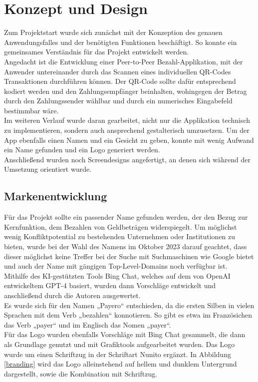 
\chapter{Konzept und Design}

Zum Projektstart wurde sich zunächst mit der Konzeption des genauen Anwendungsfalles und der benötigten Funktionen beschäftigt.
So konnte ein gemeinsames Verständnis für das Projekt entwickelt werden.
\\
Angedacht ist die Entwicklung einer Peer-to-Peer Bezahl-Applikation, mit der Anwender untereinander durch das Scannen eines individuellen QR-Codes Transaktionen durchführen können.
Der QR-Code sollte dafür entsprechend kodiert werden und den Zahlungsempfänger beinhalten, wohingegen der Betrag durch den Zahlungssender wählbar und durch ein numerisches Eingabefeld bestimmbar wäre.
\\
Im weiteren Verlauf wurde daran gearbeitet, nicht nur die Applikation technisch zu implementieren, sondern auch ansprechend gestalterisch umzusetzen. Um der App ebenfalls einen Namen und ein Gesicht zu geben, konnte mit wenig Aufwand ein Name gefunden und ein Logo generiert werden.
\\
Anschließend wurden noch Screendesigns angefertigt, an denen sich während der Umsetzung orientiert wurde. 

\section{Markenentwicklung}

Für das Projekt sollte ein passender Name gefunden werden, der den Bezug zur Kernfunktion, dem Bezahlen von Geldbeträgen widerspiegelt.
Um möglichst wenig Konfliktpotential zu bestehenden Unternehmen oder Institutionen zu bieten, wurde bei der Wahl des Namens im Oktober 2023 darauf geachtet, dass dieser möglichst keine Treffer bei der Suche mit Suchmaschinen wie Google bietet und auch der Name mit gängigen Top-Level-Domains noch verfügbar ist.  
\\
Mithilfe des KI-gestützten Tools Bing Chat, welches auf dem von OpenAI entwickeltem GPT-4 basiert, wurden dann Vorschläge entwickelt und anschließend durch die Autoren ausgewertet.
\\
Es wurde sich für den Namen „Payero“ entschieden, da die ersten Silben in vielen Sprachen mit dem Verb „bezahlen“ konnotieren.
So gibt es etwa im Französichen das Verb „payer“ und im Englisch das Nomen „payer“.
\\
Für das Logo wurden ebenfalls Vorschläge mit Bing Chat gesammelt, die dann als Grundlage genutzt und mit Grafiktools aufgearbeitet wurden.
Das Logo wurde um einen Schriftzug in der Schriftart Nunito ergänzt.
In Abbildung \ref{branding} wird das Logo alleinstehend auf hellem und dunklem Untergrund dargestellt, sowie die Kombination mit Schriftzug.

